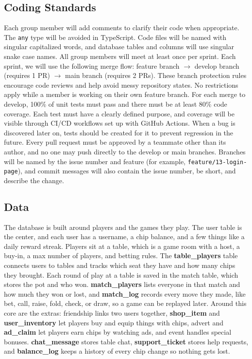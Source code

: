 \documentclass{article}
\begin{document}
\subsection{Coding Standards}
Each group member will add comments to clarify their code when appropriate. The \texttt{any} type will be avoided in TypeScript. Code files will be named with singular capitalized words, and database tables and columns will use singular snake case names. All group members will meet at least once per sprint. Each sprint, we will use the following merge flow: feature branch $\rightarrow$ develop branch (requires 1 PR) $\rightarrow$ main branch (requires 2 PRs). These branch protection rules encourage code reviews and help avoid messy repository states. No restrictions apply while a member is working on their own feature branch. For each merge to develop, 100\% of unit tests must pass and there must be at least 80\% code coverage. Each test must have a clearly defined purpose, and coverage will be visible through CI/CD workflows set up with GitHub Actions. When a bug is discovered later on, tests should be created for it to prevent regression in the future. Every pull request must be approved by a teammate other than its author, and no one may push directly to the develop or main branches. Branches will be named by the issue number and feature (for example, \texttt{feature/13-login-page}), and commit messages will also contain the issue number, be short, and describe the change. 


\subsection{Data}
The database is built around players and the games they play. The user table is the center, and each user has a username, a chip balance, and a few things like a daily reward streak. Players sit at a table, which is a game room with a host, a buy-in, a max number of players, and betting rules. The \textbf{table\_players} table connects users to tables and tracks which seat they have and how many chips they brought. Each round of play at a table is saved in the match table, which stores the pot and who won. \textbf{match\_players} lists everyone in that match and how much they won or lost, and \textbf{match\_log} records every move they made, like bet, call, raise, fold, check, or draw, so a game can be replayed later. Around this core are the extras: friendship links two users together, \textbf{shop\_item} and \textbf{user\_inventory} let players buy and equip things with chips, advert and \textbf{ad\_claim} let players earn chips by watching ads, and event handles special bonuses. \textbf{chat\_message} stores table chat, \textbf{support\_ticket} stores help requests, and \textbf{balance\_log} keeps a history of every chip change so nothing gets lost.
\end{document}
